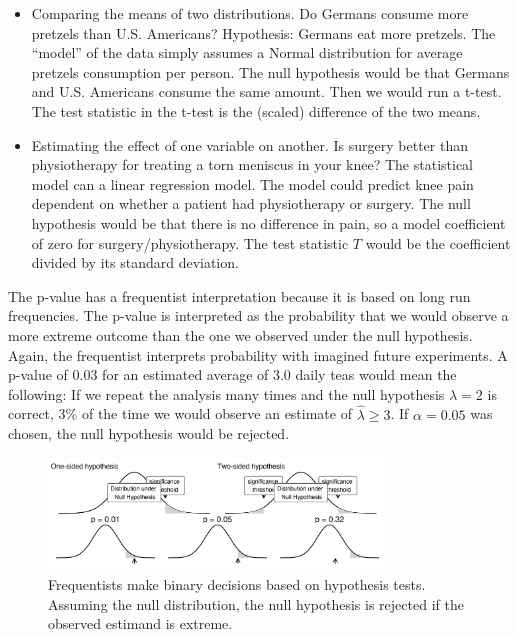 \documentclass[
  10pt,
]{scrbook}
\providecommand{\tightlist}{%
  \setlength{\itemsep}{0pt}\setlength{\parskip}{0pt}}
\begin{document}
\begin{itemize}
\tightlist
\item
  Comparing the means of two distributions. Do Germans consume more pretzels than U.S. Americans? Hypothesis: Germans eat more pretzels. The ``model'' of the data simply assumes a Normal distribution for average pretzels consumption per person. The null hypothesis would be that Germans and U.S. Americans consume the same amount. Then we would run a t-test. The test statistic in the t-test is the (scaled) difference of the two means.
\item
  Estimating the effect of one variable on another. Is surgery better than physiotherapy for treating a torn meniscus in your knee? The statistical model can a linear regression model. The model could predict knee pain dependent on whether a patient had physiotherapy or surgery. The null hypothesis would be that there is no difference in pain, so a model coefficient of zero for surgery/physiotherapy. The test statistic \(T\) would be the coefficient divided by its standard deviation.
\end{itemize}

The p-value has a frequentist interpretation because it is based on long run frequencies.
The p-value is interpreted as the probability that we would observe a more extreme outcome than the one we observed under the null hypothesis.
Again, the frequentist interprets probability with imagined future experiments.
A p-value of 0.03 for an estimated average of 3.0 daily teas would mean the following:
If we repeat the analysis many times and the null hypothesis \(\lambda = 2\) is correct, 3\% of the time we would observe an estimate of \(\hat{\lambda} \geq 3\).
If \(\alpha = 0.05\) was chosen, the null hypothesis would be rejected.

\begin{figure}

{\centering \includegraphics[width=0.8\textwidth]{figures/hypothesis-1} 

}

\caption{Frequentists make binary decisions based on hypothesis tests. Assuming the null distribution, the null hypothesis is rejected if the observed estimand is extreme.}\label{fig:hypothesis}
\end{figure}
\end{document}
